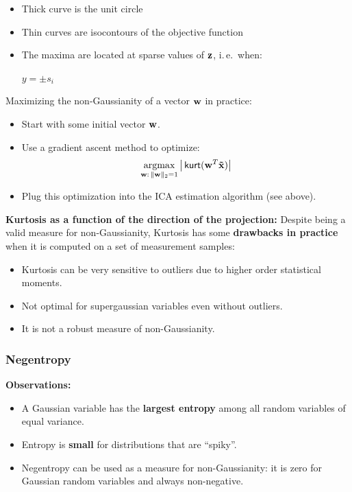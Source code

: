   \begin{itemize}
    \item Thick curve is the unit circle
    \item Thin curves are isocontours of the objective function            
    \item The maxima are located at sparse values of $\bm{\mathrm{z}}$, i.\,e.\ when:
      \begin{center}
            $y = \pm s_i$
      \end{center}
  \end{itemize}
Maximizing the non-Gaussianity of a vector $\bm{\mathrm{w}}$ in practice:
  \begin{itemize}
    \item Start with some initial vector $\bm{\mathrm{w}}$.            
    \item Use a gradient ascent method to optimize:
      \begin{displaymath}
        \operatorname*{argmax}_{\bm{\mathrm{w}}:\,\|\bm{\mathrm{w}}\|_2=1} \big| \mathop{\mathsf{kurt}}(\bm{\mathrm{w}}^T \bm{\mathrm{\tilde x}}) \big| 
      \end{displaymath}
    \item Plug this optimization into the ICA estimation algorithm (see above).
  \end{itemize}
 
 \textbf {Kurtosis as a function of the direction of the projection:}
  Despite being a valid measure for non-Gaussianity, Kurtosis has some \textbf{drawbacks in practice} when it is computed on a set of measurement samples:
  \begin{itemize}
    \item Kurtosis can be very sensitive to outliers due to higher order statistical moments.            
    \item Not optimal for supergaussian variables even without outliers.            
    \item It is not a robust measure of non-Gaussianity.
  \end{itemize}
    
\subsubsection{Negentropy}
  
 \textbf {Observations:}

  \begin{itemize}
    \item A Gaussian variable has the \textbf {largest entropy} among all random variables of equal variance.            
    \item Entropy is \textbf {small} for distributions that are ``spiky''.            
    \item Negentropy can be used as a measure for non-Gaussianity: it is zero for Gaussian random variables and always non-negative.
  \end{itemize}
 
